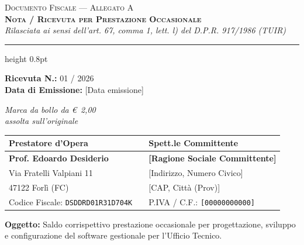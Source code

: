 \documentclass[11pt,a4paper]{article}
\begin{document}
\newpage

\begin{center}
  {\footnotesize\scshape Documento Fiscale --- Allegato A}\\[0.3em]
  {\Large\bfseries\scshape Nota / Ricevuta per Prestazione Occasionale}\\[0.3em]
  {\small\itshape Rilasciata ai sensi dell'art. 67, comma 1, lett. l) del D.P.R. 917/1986 (TUIR)}
\end{center}

\vspace{0.4em}
\hrule height 0.8pt
\vspace{1.2em}

\noindent
\begin{minipage}[t]{0.5\textwidth}
  \textbf{Ricevuta N.:} 01 / 2026\\
  \textbf{Data di Emissione:} [Data emissione]
\end{minipage}
\hfill
\begin{minipage}[t]{0.45\textwidth}
  \raggedleft
  \itshape\small
  Marca da bollo da \euro~2,00\\assolta sull'originale
\end{minipage}

\vspace{1.2em}

\noindent
\begin{tabularx}{\textwidth}{@{} X p{0.5cm} X @{}}
  \toprule
  \textbf{Prestatore d'Opera} & & \textbf{Spett.le Committente} \\
  \midrule
  \textbf{Prof. Edoardo Desiderio} & & \textbf{[Ragione Sociale Committente]} \\
  Via Fratelli Valpiani 11 & & [Indirizzo, Numero Civico] \\
  47122 Forlì (FC) & & [CAP, Città (Prov)] \\
  Codice Fiscale: \texttt{DSDDRD01R31D704K} & & P.IVA / C.F.: \texttt{[00000000000]} \\
  \bottomrule
\end{tabularx}

\vspace{1.5em}

\noindent
\textbf{Oggetto:} Saldo corrispettivo prestazione occasionale per progettazione, sviluppo e configurazione del software gestionale per l'Ufficio Tecnico.
\end{document}
